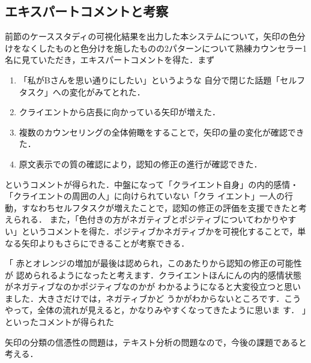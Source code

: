 \documentclass[shuuron]{kuee}
\begin{document}
%

\subsection{エキスパートコメントと考察} %

前節のケーススタディの可視化結果を出力した本システムについて，矢印の色分けをなくしたものと色分けを施したものの2パターンについて熟練カウンセラー1名に見ていただき，エキスパートコメントを得た．まず
\begin{enumerate}

  \item 「私がBさんを思い通りにしたい」というような
  自分で閉じた話題「セルフタスク」への変化がみてとれた．
  \item クライエントから店長に向かっている矢印が増えた．
  \item 複数のカウンセリングの全体俯瞰をすることで，矢印の量の変化が確認できた．
  \item 原文表示での質の確認により，認知の修正の進行が確認できた．
\end{enumerate}
というコメントが得られた．中盤になって「クライエント自身」の内的感情・「クライエントの周囲の人」に向けられていない「クラ
イエント」一人の行動，すなわちセルフタスクが増えたことで，認知の修正の評価を支援できたと考えられる．
また，「色付きの方がネガティブとポジティブについてわかりやすい」というコメントを得た．ポジティブかネガティブかを可視化することで，単なる矢印よりもさらにできることが考察できる．


「
赤とオレンジの増加が最後は認められ，このあたりから認知の修正の可能性が
認められるようになったと考えます．クライエントほんにんの内的感情状態がネガティブなのかポジティブなのかが
わかるようになると大変役立つと思いました．大きさだけでは，ネガティブかど
うかがわからないところです．こうやって，全体の流れが見えると，かなりみやすくなってきたように思いま
す．
」といったコメントが得られた

矢印の分類の信憑性の問題は，テキスト分析の問題なので，今後の課題であると考える．
\end{document}

